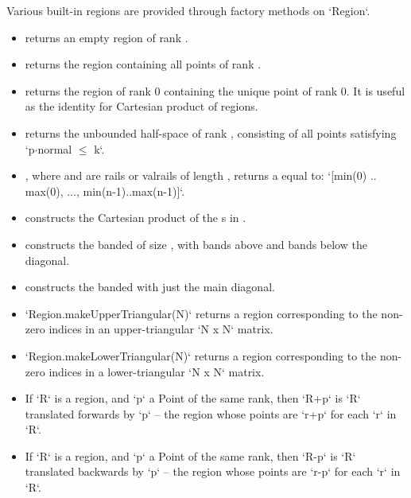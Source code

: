 Various built-in regions are provided through  factory
methods on \xcd`Region`.  
\begin{itemize}
\item {} returns an empty region of rank .
\item {} returns the region containing all points of
      rank .  
\item {} returns the region of rank 0 containing the
      unique point of rank 0.  It is useful as the identity for Cartesian
      product of regions.
\item {} returns the unbounded
      half-space of rank , consisting of all points 
      satisfying \xcdmath`p$\cdot$normal $\le$ k`.
\item {}, where  and 
      are  rails or valrails of length , returns a
       equal to: 
      \xcdmath`[min(0) .. max(0), $\ldots$, min(n-1)..max(n-1)]`.
\item {} constructs the Cartesian product of the
      s in .
\item {} constructs the
      banded  of size , with  bands above
      and  bands below the diagonal.
\item {} constructs the banded  with
      just the main diagonal.
\item \xcd`Region.makeUpperTriangular(N)` returns a region corresponding
to the non-zero indices in an upper-triangular \xcd`N x N` matrix.
\item \xcd`Region.makeLowerTriangular(N)` returns a region corresponding
to the non-zero indices in a lower-triangular \xcd`N x N` matrix.
\item 
  If \xcd`R` is a region, and \xcd`p` a Point of the same rank, then 
  \xcd`R+p` is \xcd`R` translated forwards by 
  \xcd`p` -- the region whose
  points are \xcd`r+p` 
  for each \xcd`r` in \xcd`R`.
\item 
  If \xcd`R` is a region, and \xcd`p` a Point of the same rank, then 
  \xcd`R-p` is \xcd`R` translated backwards by 
  \xcd`p` -- the region whose
  points are \xcd`r-p` 
  for each \xcd`r` in \xcd`R`.

\end{itemize}

